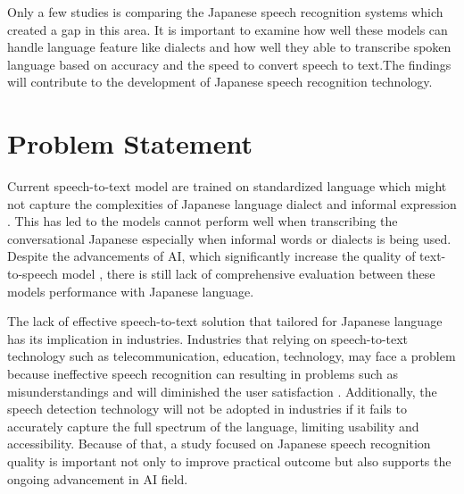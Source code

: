 Only a few studies is comparing the Japanese speech recognition systems which created a gap in this area. It is important to examine how well these models can handle language feature like dialects and how well they able to transcribe spoken language based on accuracy and the speed to convert speech to text.The findings will contribute to the development of Japanese speech recognition technology.



\section{Problem Statement}


Current speech-to-text model are trained on standardized language which might not capture the complexities of Japanese language dialect and informal expression \parencite{imaizumi2022}. This has led to the models cannot perform well when transcribing the conversational Japanese especially when informal words or dialects is being used. Despite the advancements of AI, which significantly increase the quality of text-to-speech model \parencite{Karita2021}, there is still lack of comprehensive evaluation between these models performance with Japanese language. 


The lack of effective speech-to-text solution that tailored for Japanese language has its implication in industries. Industries that relying on speech-to-text technology such as telecommunication, education, technology, may face a problem because ineffective speech recognition can resulting in problems such as misunderstandings and will diminished the user satisfaction \parencite{Sztahó2023}. Additionally, the speech detection technology will not be adopted in industries if it fails to accurately capture the full spectrum of the language, limiting usability and accessibility. Because of that, a study focused on Japanese speech recognition quality is important not only to improve practical outcome but also supports the ongoing advancement in AI field. 





